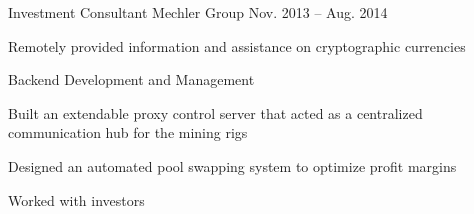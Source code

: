 \begin{cventries}

    \cventry%
      {Investment Consultant} %
      {Mechler Group} %
      {} %
      {Nov. 2013 -- Aug. 2014} %
      {
        \begin{cvitems} %
          \item {Remotely provided information and assistance on cryptographic currencies}
          \item {Backend Development and Management}
            \vspace{1.5mm}
            \begin{cvitems}
              \item {Built an extendable proxy control server that acted as a centralized %
              communication hub for the mining rigs}
              \item {Designed an automated pool swapping system to optimize profit margins}
            \end{cvitems}
            \vspace{2.0mm}
          \item {Worked with investors}
        \end{cvitems}
      }


\end{cventries}
